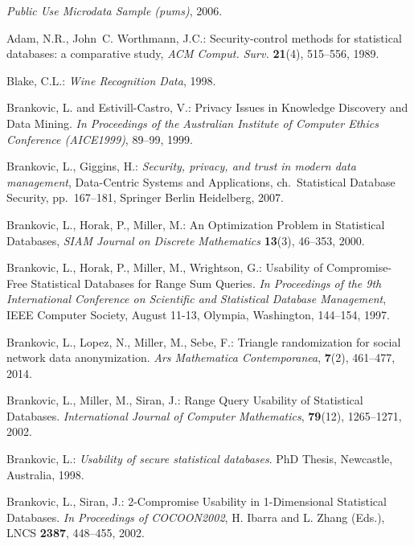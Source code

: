 \documentclass{llncs}
\begin{document}


\begin{thebibliography}{10}

\emph{{Public Use Microdata Sample} (pums)}, 2006.

Adam, N.R., John~C. Worthmann, J.C.: {Security-control methods for
  statistical databases: a comparative study}, \emph{ACM Comput. Surv.} \textbf{21}(4),
   515--556, 1989.

Blake, C.L.: \emph{{Wine Recognition Data}}, 1998.

Brankovic, L. and Estivill-Castro, V.: Privacy Issues in Knowledge Discovery and Data Mining. \emph{In Proceedings of the Australian Institute of Computer Ethics Conference (AICE1999)}, 89--99, 1999. 

Brankovic, L., Giggins, H.: \emph{Security, privacy, and trust in
  modern data management}, Data-Centric Systems and Applications,
  ch.~Statistical Database Security, pp.~167--181, Springer Berlin Heidelberg,
  2007.
	
Brankovic, L., Horak, P., Miller, M.: {An Optimization Problem in Statistical Databases}, \emph{SIAM Journal on Discrete Mathematics} \textbf{13}(3),
  46--353, 2000.




Brankovic, L., Horak, P., Miller, M., Wrightson, G.:
Usability of Compromise-Free Statistical Databases for Range Sum Queries.
\emph{In Proceedings of the 9th International Conference on Scientific and Statistical Database Management}, IEEE Computer Society, August 11-13, Olympia, Washington, 144--154, 1997.

Brankovic, L., Lopez, N., Miller, M., Sebe, F.: Triangle randomization for social network data anonymization. \emph{Ars Mathematica Contemporanea}, \textbf{7}(2),   461--477, 2014. 

Brankovic, L., Miller, M., Siran, J.:
Range Query Usability of Statistical Databases.
\emph{International Journal of Computer Mathematics}, \textbf{79}(12), 1265--1271, 2002.

Brankovic, L.:
\emph{Usability of secure statistical databases}.
PhD Thesis, Newcastle, Australia,  1998.

Brankovic, L.,  Siran, J.:
2-Compromise Usability in 1-Dimensional Statistical Databases.
\emph{In Proceedings of COCOON2002},  H. Ibarra and L. Zhang (Eds.), LNCS \textbf{2387}, 448--455, 2002.


\end{thebibliography}
\end{document}
